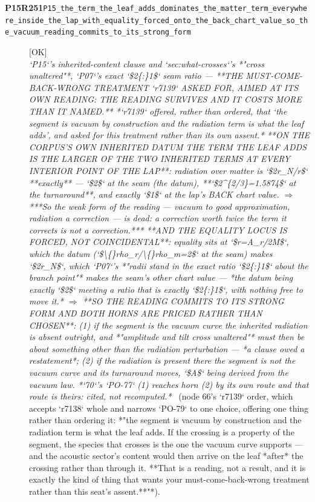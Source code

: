 \begin{description}
\item[\textbf{P15R251}\quad\texttt{P15\_the\_term\_the\_leaf\_adds\_dominates\_the\_matter\_term\_everywhere\_inside\_the\_lap\_with\_equality\_forced\_onto\_the\_back\_chart\_value\_so\_the\_vacuum\_reading\_commits\_to\_its\_strong\_form}]\hfill\textsf{[OK]}\\
\textit{`P15`'s inherited-content clause and `sec:what-crosses`'s *"cross unaltered"*, `P07`'s exact `\$2\{:\}1\$` seam ratio ---  **THE MUST-COME-BACK-WRONG TREATMENT `r7139` ASKED FOR, AIMED AT ITS OWN READING: THE READING SURVIVES AND IT COSTS MORE THAN IT NAMED.** *`r7139` offered, rather than ordered, that `the segment is vacuum by construction and the radiation term is what the leaf adds', and asked for this treatment rather than its own assent.*  **ON THE CORPUS'S OWN INHERITED DATUM THE TERM THE LEAF ADDS IS THE LARGER OF THE TWO INHERITED TERMS AT EVERY INTERIOR POINT OF THE LAP**: radiation over matter is `\$2r\_N/r\$` **exactly** --- `\$2\$` at the seam (the datum), **`\$2\textasciicircum{}\{2/3\}=1.5874\$` at the turnaround**, and exactly `\$1\$` at the lap's BACK chart value. \ensuremath{\Rightarrow} ***So the weak form of the reading --- vacuum to good approximation, radiation a correction --- is dead: a correction worth twice the term it corrects is not a correction.***  **AND THE EQUALITY LOCUS IS FORCED, NOT COINCIDENTAL**: equality sits at `\$r=A\_r/2M\$`, which the datum (`\$\textbackslash\{\}rho\_r/\textbackslash\{\}rho\_m=2\$` at the seam) makes `\$2r\_N\$`, which `P07`'s *"radii stand in the exact ratio `\$2\{:\}1\$` about the branch point"* makes the seam's other chart value --- *the datum being exactly `\$2\$` meeting a ratio that is exactly `\$2\{:\}1\$`, with nothing free to move it.* \ensuremath{\Rightarrow} **SO THE READING COMMITS TO ITS STRONG FORM AND BOTH HORNS ARE PRICED RATHER THAN CHOSEN**: (1) if the segment is the vacuum curve the inherited radiation is absent outright, and *"amplitude and tilt cross unaltered"* must then be about something other than the radiation perturbation --- *a clause owed a restatement*; (2) if the radiation is present there the segment is not the vacuum curve and its turnaround moves, `\$A\$` being derived from the vacuum law.  *`70`'s `PO-77` (1) reaches horn (2) by its own route and that route is theirs: cited, not recomputed.*} \ (node 66's `r7139` order, which accepts `r7138` whole and narrows `PO-79` to one choice, offering one thing rather than ordering it: *"the segment is vacuum by construction and the radiation term is what the leaf adds. If the crossing is a property of the segment, the species that crosses is the one the vacuum curve supports --- and the acoustic sector's content would then arrive on the leaf *after* the crossing rather than through it. **That is a reading, not a result, and it is exactly the kind of thing that wants your must-come-back-wrong treatment rather than this seat's assent.**"*). 

\end{description}

